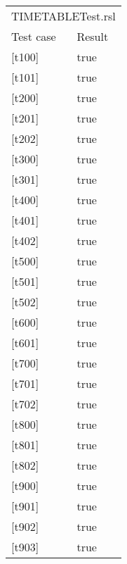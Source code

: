 \documentclass[a4]{article}
\begin{document}
\begin{table}[h]
    \begin{tabular}{ll}
        \multicolumn{2}{l}{TIMETABLETest.rsl}   \\
        \multicolumn{1}{l|}{Test case}  & Result \\ \hline 
        \multicolumn{1}{l|}{{[}t100{]}} & true   \\
        \multicolumn{1}{l|}{{[}t101{]}} & true   \\
        \multicolumn{1}{l|}{{[}t200{]}} & true   \\
        \multicolumn{1}{l|}{{[}t201{]}} & true   \\
        \multicolumn{1}{l|}{{[}t202{]}} & true   \\
        \multicolumn{1}{l|}{{[}t300{]}} & true   \\
        \multicolumn{1}{l|}{{[}t301{]}} & true   \\
        \multicolumn{1}{l|}{{[}t400{]}} & true   \\
        \multicolumn{1}{l|}{{[}t401{]}} & true   \\
        \multicolumn{1}{l|}{{[}t402{]}} & true   \\
        \multicolumn{1}{l|}{{[}t500{]}} & true   \\
        \multicolumn{1}{l|}{{[}t501{]}} & true   \\
        \multicolumn{1}{l|}{{[}t502{]}} & true   \\
        \multicolumn{1}{l|}{{[}t600{]}} & true   \\
        \multicolumn{1}{l|}{{[}t601{]}} & true   \\
        \multicolumn{1}{l|}{{[}t700{]}} & true   \\
        \multicolumn{1}{l|}{{[}t701{]}} & true   \\
        \multicolumn{1}{l|}{{[}t702{]}} & true   \\
        \multicolumn{1}{l|}{{[}t800{]}} & true   \\
        \multicolumn{1}{l|}{{[}t801{]}} & true   \\
        \multicolumn{1}{l|}{{[}t802{]}} & true   \\
        \multicolumn{1}{l|}{{[}t900{]}} & true   \\
        \multicolumn{1}{l|}{{[}t901{]}} & true   \\
        \multicolumn{1}{l|}{{[}t902{]}} & true   \\
        \multicolumn{1}{l|}{{[}t903{]}} & true   \\

\end{tabular}
\end{table}
\end{document}
